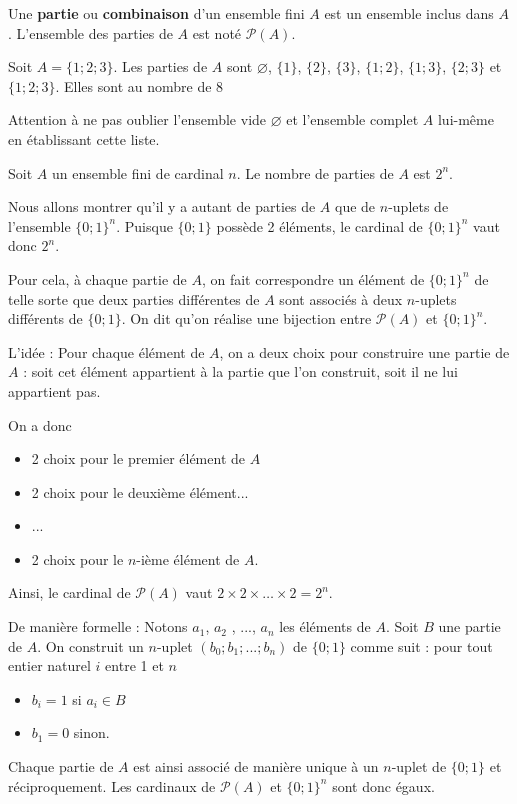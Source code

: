 \documentclass[11pt,fleqn, openany]{book} %
\begin{document}
 \begin{definition} Une \textbf{partie} ou \textbf{combinaison} d'un ensemble fini $A$ est un ensemble inclus dans $A$. L'ensemble des parties de $A$ est noté $\mathcal{P}(A)$.\end{definition}


\begin{example} Soit $A=\{1;2;3\}$. Les parties de $A$ sont $\varnothing$, $\{1\}$, $\{2\}$, $\{3\}$, $\{1;2\}$, $\{1;3\}$, $\{2;3\}$ et $\{1;2;3\}$. Elles sont au nombre de $8$

Attention à ne pas oublier l'ensemble vide $\varnothing$ et l'ensemble complet $A$ lui-même en établissant cette liste.\end{example} 
 
 \begin{proposition}
Soit $A$ un ensemble fini de cardinal $n$. Le nombre de parties de $A$ est $2^n$.\end{proposition}
 
\begin{demonstration} Nous allons montrer qu'il y a autant de parties de $A$ que de $n$-uplets de l'ensemble $\{0;1\}^n$. Puisque $\{0;1\}$ possède 2 éléments, le cardinal de $\{0;1\}^n$ vaut donc $2^n$.
 
 Pour cela, à chaque partie de $A$, on fait correspondre un élément de $\{0;1\}^n$ de telle sorte que deux parties différentes de $A$  sont associés à deux $n$-uplets différents de $\{0;1\}$. On dit qu'on réalise une bijection entre $\mathcal{P}(A)$ et $\{0;1\}^n$.
 
 L'idée : Pour chaque élément de $A$, on a deux choix pour construire une partie de $A$ : soit cet élément appartient à la partie que l'on construit, soit il ne lui appartient pas. 

\newpage 
 
 On a donc
 \begin{itemize}
 \item 2 choix pour le premier élément de $A$
 \item 2 choix pour le deuxième élément...
 \item ...
 \item 2 choix pour le $n$-ième élément de $A$.
 \end{itemize}
 Ainsi, le cardinal de $\mathcal{P}(A)$ vaut $2\times 2 \times \ldots \times 2 = 2^n$.
 
 
De manière formelle : Notons $a_1$, $a_2$ , ..., $a_n$ les éléments de $A$. 
  Soit $B$ une partie de $A$. On construit un $n$-uplet $(b_0;b_1;...;b_n)$ de $\{0;1\}$ comme suit : pour tout entier naturel $i$ entre 1 et $n$
  \begin{itemize}
  \item $b_i=1$ si $a_i \in B$
  \item $b_1=0$ sinon.
  \end{itemize}
Chaque partie de $A$ est ainsi associé de manière unique à un $n$-uplet de $\{0;1\}$ et réciproquement. Les cardinaux de $\mathcal{P}(A)$ et $\{0;1\}^n$ sont donc égaux.\end{demonstration}
\end{document}
